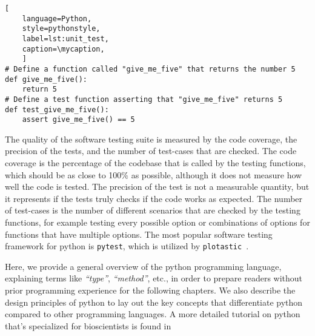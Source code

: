 \def\mycaption{ Example of an arbitrary python function and its respective unit
    test function. The first function simply returns the number 5. The second
    function tests if the first function indeed returns the number 5. The test
    function is named with the prefix ``\texttt{test\_}'' and is placed in a
    file that ends with the suffix ``\texttt{\_test.py}''. The test function is
    executed by the testing framework \texttt{pytest}. Note that code after
    ``\texttt{\#}'' is considered a comment and won't be executed.}
\begin{lstlisting}[
    language=Python, 
    style=pythonstyle,
    label=lst:unit_test, 
    caption=\mycaption,
    ]
# Define a function called "give_me_five" that returns the number 5
def give_me_five():
    return 5
# Define a test function asserting that "give_me_five" returns 5
def test_give_me_five():
    assert give_me_five() == 5 
\end{lstlisting}

The quality of the software testing suite is measured by the code coverage, the
precision of the tests, and the number of test-cases that are checked. The code
coverage is the percentage of the codebase that is called by the testing
functions, which should be as close to 100\% as possible, although it does not
measure how well the code is tested. The precision of the test is not a
measurable quantity, but it represents if the tests truly checks if the code
works as expected. The number of test-cases is the number of different scenarios
that are checked by the testing functions, for example testing every possible
option or combinations of options for functions that have multiple options. The
most popular software testing framework for python is \texttt{pytest}, which is
utilized by \texttt{plotastic}~\cite{pytestx.y}.



Here, we provide a general overview of the python programming language,
explaining terms like \textit{``type''}, \textit{``method''}, etc., in order to
prepare readers without prior programming experience for the following chapters.
We also describe the design principles of python to lay out the key concepts
that differentiate python compared to other programming languages. A more
detailed tutorial on python that's specialized for bioscientists is found
in~\citealt{ekmekciIntroductionProgrammingBioscientists2016}


